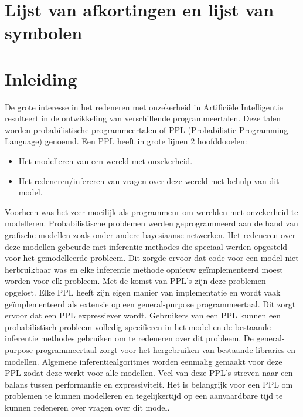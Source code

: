 \documentclass[12pt,a4paper,oneside]{book}
\theoremstyle{definition}
\begin{document}
\chapter{Lijst van afkortingen en lijst van symbolen}
\tableofcontents


\newpage
\mainmatter
\setcounter{page}{0}

\chapter{Inleiding}
De grote interesse in het redeneren met onzekerheid in Artifici\"{e}le Intelligentie resulteert in de ontwikkeling van verschillende programmeertalen. Deze talen worden probabilistische programmeertalen of PPL (Probabilistic Programming Language) genoemd. Een PPL heeft in grote lijnen 2 hoofddooelen:
\begin{itemize}
  \item Het modelleren van een wereld met onzekerheid.
  \item Het redeneren/infereren van vragen over deze wereld met behulp van dit model.
\end{itemize}
Voorheen was het zeer moeilijk als programmeur om werelden met onzekerheid te modelleren. Probabilistische problemen werden geprogrammeerd aan de hand van grafische modellen zoals onder andere bayesiaanse netwerken. Het redeneren over deze modellen gebeurde met inferentie methodes die speciaal werden opgesteld voor het gemodelleerde probleem. Dit zorgde ervoor dat code voor een model niet herbruikbaar was en elke inferentie methode opnieuw ge\"{i}mplementeerd moest worden voor elk probleem. Met de komst van PPL's zijn deze problemen opgelost. Elke PPL heeft zijn eigen manier van implementatie en wordt vaak ge\"{i}mplementeerd als extensie op een general-purpose programmeertaal. Dit zorgt ervoor dat een PPL expressiever wordt. Gebruikers van een PPL kunnen een probabilistisch probleem volledig specifieren in het model en de bestaande inferentie methodes gebruiken om te redeneren over dit probleem. De general-purpose programmeertaal zorgt voor het hergebruiken van bestaande libraries en modellen. Algemene inferentiealgoritmes worden eenmalig gemaakt voor deze PPL zodat deze werkt voor alle modellen. Veel van deze PPL’s streven naar een balans tussen performantie en expressiviteit. Het is belangrijk voor een PPL om problemen te kunnen modelleren en tegelijkertijd op een aanvaardbare tijd te kunnen redeneren over vragen over dit model.
\end{document}
